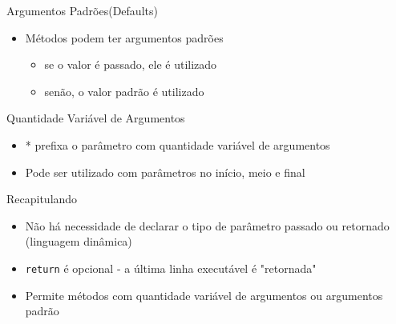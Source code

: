 \begin{frame}[fragile,t]{Argumentos Padrões(Defaults)}
  \begin{itemize}
    \item Métodos podem ter argumentos padrões
    \begin{itemize}
    	\item se o valor é passado, ele é utilizado
    	\item senão, o valor padrão é utilizado
    \end{itemize}
  \end{itemize}  
  
\end{frame}

\begin{frame}[fragile,t]{Quantidade Variável de Argumentos}
  \begin{itemize}
    \item \alert{*} prefixa o parâmetro com quantidade variável de argumentos
  \end{itemize}
  \begin{itemize}
    \item Pode ser utilizado com parâmetros no início, meio e final
  \end{itemize}
  
\end{frame}

\begin{frame}[fragile,t]{Recapitulando}
  \begin{itemize}
    \item \alert{Não há necessidade} de declarar o tipo de parâmetro passado ou retornado (linguagem dinâmica)
    \item \verb!return! é \alert{opcional} - a última linha executável é "retornada"
    \item Permite métodos com \alert{quantidade variável} de argumentos ou argumentos padrão
  \end{itemize}
\end{frame}



